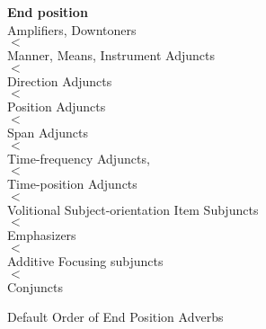 \begin{singlespace}    
\begin{figure}[htbp]
  \small
    {\bf End position} \\
    \hspace*{2cm} Amplifiers, Downtoners \\
    \hspace*{2cm} $<$ \\
    \hspace*{2cm} Manner, Means, Instrument Adjuncts \\
    \hspace*{2cm} $<$ \\
    \hspace*{2cm} Direction Adjuncts \\
    \hspace*{2cm} $<$ \\
    \hspace*{2cm} Position Adjuncts \\
    \hspace*{2cm} $<$ \\
    \hspace*{2cm} Span Adjuncts \\
    \hspace*{2cm} $<$ \\
    \hspace*{2cm} Time-frequency Adjuncts, \\
    \hspace*{2cm} $<$ \\
    \hspace*{2cm} Time-position Adjuncts \\
    \hspace*{2cm} $<$ \\
    \hspace*{2cm} Volitional Subject-orientation Item Subjuncts \\
    \hspace*{2cm} $<$ \\
    \hspace*{2cm} Emphasizers \\
    \hspace*{2cm} $<$ \\
    \hspace*{2cm} Additive Focusing subjuncts \\
    \hspace*{2cm} $<$ \\
    \hspace*{2cm} Conjuncts
  \caption{Default Order of End Position Adverbs}
  \label{fig:order-e}
\end{figure}
\end{singlespace}

